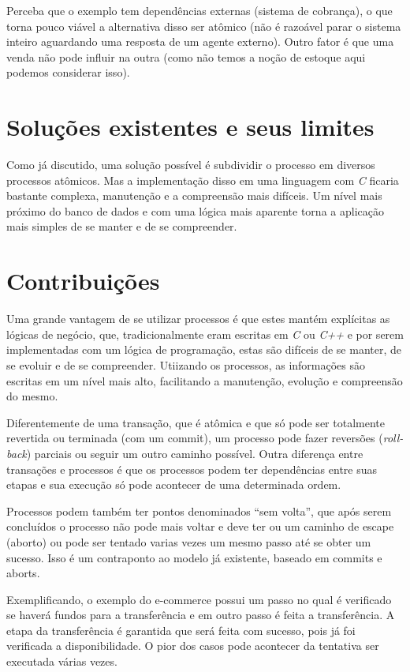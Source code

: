 \documentclass[a4paper,12pt,notitlepage]{article}
\begin{document}
Perceba que o exemplo tem dependências externas (sistema de cobrança), o que torna pouco viável a alternativa disso ser atômico (não é razoável parar o sistema inteiro aguardando uma resposta de um agente externo). Outro fator é que uma venda não pode influir na outra (como não temos a noção de estoque aqui podemos considerar isso).  


\section{Soluções existentes e seus limites}

Como já discutido, uma solução possível é subdividir o processo em diversos processos atômicos. Mas a implementação disso em uma linguagem com \textit{C} ficaria bastante complexa, manutenção e a compreensão mais difíceis. Um nível mais próximo do banco de dados e com uma lógica mais aparente torna a aplicação mais simples de se manter e de se compreender. 


\section{Contribuições}

Uma grande vantagem de se utilizar processos é que estes mantém explícitas as lógicas de negócio, que, tradicionalmente eram escritas em \textit{C} ou \textit{C++}  e por serem implementadas com um lógica de programação, estas são difíceis de se manter, de se evoluir e de se compreender. Utiizando os processos, as informações são escritas em um nível mais alto, facilitando a manutenção, evolução e compreensão do mesmo. 

Diferentemente de uma transação, que é atômica e que só pode ser totalmente revertida ou terminada (com um commit),  um processo pode fazer reversões (\textit{roll-back}) parciais ou seguir um outro caminho possível. Outra diferença entre transações e processos é que os processos podem ter dependências entre suas etapas e sua execução só pode acontecer de uma determinada ordem. 

Processos podem também ter pontos denominados ``sem volta'', que após serem concluídos o processo não pode mais voltar e deve ter ou um caminho de escape (aborto) ou pode ser tentado varias vezes um mesmo passo até se obter um sucesso. Isso é um contraponto ao modelo já existente, baseado em commits e aborts. 

Exemplificando, o exemplo do e-commerce possui um passo no qual é verificado se haverá fundos para a transferência e em outro passo é feita a transferência. A etapa da transferência é garantida que será feita com sucesso, pois já foi verificada a disponibilidade. O pior dos casos pode acontecer da tentativa ser executada várias vezes. 
\end{document}
